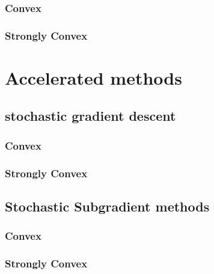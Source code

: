 \subsubsection{Convex}

\subsubsection{Strongly Convex}




\section{Accelerated methods}
\subsection{stochastic gradient descent}
\subsubsection{Convex}
\subsubsection{Strongly Convex}


\subsection{Stochastic Subgradient methods}

\subsubsection{Convex}

\subsubsection{Strongly Convex}









